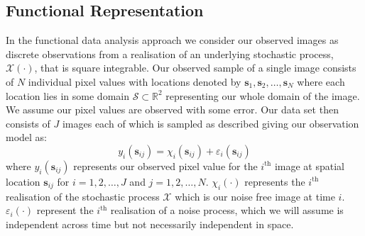 \documentclass{article}
\newcommand{\ve}[1]{\bm{{#1}}}
\begin{document}
\subsection{\label{ssec:fda_rep}Functional Representation} 
In the functional data analysis approach we consider our observed images as discrete observations from a realisation of an underlying stochastic process, $\mathcal{X}(\cdot)$, that is square integrable. Our observed sample of a single image consists of $N$ individual pixel values with locations denoted by $\ve{s}_1, \ve{s}_2, \dots, \ve{s}_N$ where each location lies in some domain $\mathcal{S} \subset \mathbb{R}^2$ representing our whole domain of the image. We assume our pixel values are observed with some error. Our data set then consists of $J$ images each of which is sampled as described giving our observation model as:
\begin{equation}
  y_i\left( \ve{s}_{ij} \right) = \chi_i\left( \ve{s}_{ij} \right) + \varepsilon_i\left( \ve{s}_{ij} \right)
  \label{eqn:obs_model}
\end{equation}
where $y_i(\ve{s}_{ij})$ represents our observed pixel value for the $i^\text{th}$ image at spatial location $\ve{s}_{ij}$ for $i=1,2,\dots,J$ and $j=1,2,\dots,N$. $\chi_{i}\left( \cdot \right)$ represents the $i^\text{th}$ realisation of the stochastic process $\mathcal{X}$ which is our noise free image at time $i$. $\varepsilon_i\left( \cdot \right)$ represent the $i^\text{th}$ realisation of a noise process, which we will assume is independent across time but not necessarily independent in space.  
\end{document}
